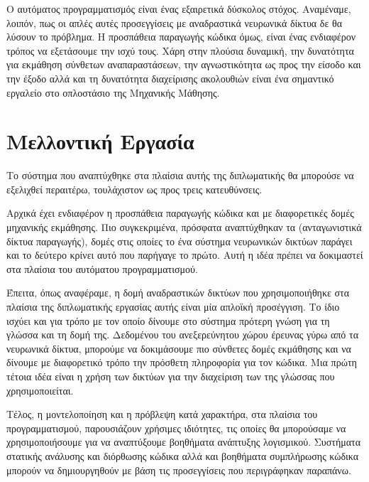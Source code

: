 Ο αυτόματος προγραμματισμός είναι ένας εξαιρετικά δύσκολος στόχος. 
Αναμέναμε, λοιπόν, πως οι απλές αυτές προσεγγίσεις με αναδραστικά νευρωνικά δίκτυα δε θα λύσουν το πρόβλημα.
Η προσπάθεια παραγωγής κώδικα όμως, είναι ένας ενδιαφέρον τρόπος να εξετάσουμε την ισχύ τους. 
Χάρη στην πλούσια δυναμική, την δυνατότητα για εκμάθηση σύνθετων αναπαραστάσεων, την αγνωστικότητα ως προς την είσοδο και την έξοδο αλλά και τη δυνατότητα διαχείρισης ακολουθιών είναι ένα σημαντικό εργαλείο στο οπλοστάσιο της Μηχανικής Μάθησης. 


\section{Μελλοντική Εργασία}

Το σύστημα που αναπτύχθηκε στα πλαίσια αυτής της διπλωματικής θα μπορούσε να εξελιχθεί περαιτέρω, τουλάχιστον ως προς τρεις κατευθύνσεις.

Αρχικά έχει ενδιαφέρον η προσπάθεια παραγωγής κώδικα και με διαφορετικές δομές μηχανικής εκμάθησης.
Πιο συγκεκριμένα, πρόσφατα αναπτύχθηκαν τα  \cite{Goodfellow2014} (ανταγωνιστικά δίκτυα παραγωγής), δομές στις οποίες το ένα σύστημα νευρωνικών δικτύων παράγει και το δεύτερο κρίνει αυτό που παρήγαγε το πρώτο.
Αυτή η ιδέα πρέπει να δοκιμαστεί στα πλαίσια του αυτόματου προγραμματισμού.

Έπειτα, όπως αναφέραμε, η δομή αναδραστικών δικτύων που χρησιμοποιήθηκε στα πλαίσια της διπλωματικής εργασίας αυτής είναι μία απλοϊκή προσέγγιση.
Το ίδιο ισχύει και για τρόπο με τον οποίο δίνουμε στο σύστημα πρότερη γνώση για τη γλώσσα και τη δομή της.
Δεδομένου του ανεξερεύνητου χώρου έρευνας γύρω από τα νευρωνικά δίκτυα, μπορούμε να δοκιμάσουμε πιο σύνθετες δομές εκμάθησης και να δίνουμε με διαφορετικό τρόπο την πρόσθετη πληροφορία για τον κώδικα.
Μια πρώτη τέτοια ιδέα είναι η χρήση των  δικτύων \cite{Tai2015} για την διαχείριση των  της γλώσσας που χρησιμοποιείται.

Τέλος, η μοντελοποίηση και η πρόβλεψη κατά χαρακτήρα, στα πλαίσια του προγραμματισμού, παρουσιάζουν χρήσιμες ιδιότητες, τις οποίες θα μπορούσαμε να χρησιμοποιήσουμε για να αναπτύξουμε βοηθήματα ανάπτυξης λογισμικού.
Συστήματα στατικής ανάλυσης και διόρθωσης κώδικα αλλά και βοηθήματα συμπλήρωσης κώδικα μπορούν να δημιουργηθούν με βάση τις προσεγγίσεις που περιγράφηκαν παραπάνω.
